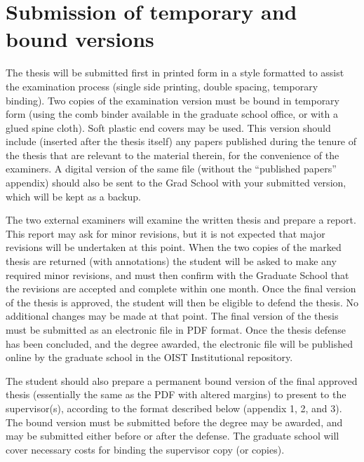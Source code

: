 \section{Submission of temporary and bound versions}

The thesis will be submitted first in printed form in a style formatted to assist the examination process (single side printing, double spacing, temporary binding).  Two copies of the examination version must be bound in temporary form (using the comb binder available in the graduate school office, or with a glued spine cloth).  Soft plastic end covers may be used. This version should include (inserted after the thesis itself)  any papers published during the tenure of the thesis that are relevant to the material therein, for the convenience of the examiners.  A digital version of the same file (without the ``published papers'' appendix) should also be sent to the Grad School with your submitted version, which will be kept as a backup.

The two external examiners will examine the written thesis and prepare a report.  This report may ask for minor revisions, but it is not expected that major revisions will be undertaken at this point. When the two copies of the marked thesis are returned (with annotations) the student will be asked to make any required minor revisions, and must then confirm with the Graduate School that the revisions are accepted and complete within one month.  Once the final version of the thesis is approved, the student will then be eligible to defend the thesis.  No additional changes may be made at that point.  The final version of the thesis must be submitted as an electronic file in PDF format.  Once the thesis defense has been concluded, and the degree awarded, the electronic file will be published online by the graduate school in the OIST Institutional repository.

The student should also prepare a permanent bound version of the final approved thesis (essentially the same as the PDF with altered margins) to present to the supervisor(s), according to the format described below (appendix 1, 2, and 3).  The bound version must be submitted before the degree may be awarded, and may be submitted either before or after the defense.  The graduate school will cover necessary costs for binding the supervisor copy (or copies).

